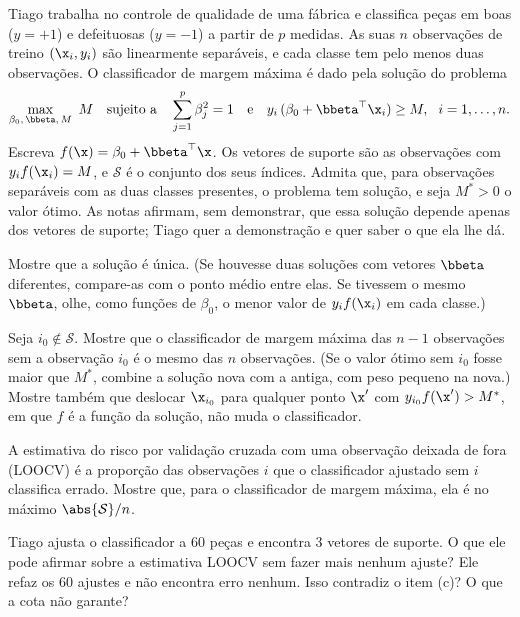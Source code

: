 Tiago trabalha no controle de qualidade de uma fábrica e classifica peças em boas ($y=+1$) e
defeituosas ($y=-1$) a partir de $p$ medidas. As suas $n$ observações de treino
$(\x_i,y_i)$ são linearmente separáveis, e cada classe tem pelo menos duas observações. O
classificador de margem máxima é dado pela solução do problema
\[
  \max_{\beta_0,\,\bbeta,\,M}\ M
  \quad\text{sujeito a}\quad
  \sum_{j=1}^p\beta_j^2=1
  \quad\text{e}\quad
  y_i\,(\beta_0+\bbeta^\top\x_i)\ge M,\ \ i=1,\dots,n .
\]
Escreva $f(\x)=\beta_0+\bbeta^\top\x$. Os vetores de suporte são as observações com
$y_if(\x_i)=M$, e $\mathcal S$ é o conjunto dos seus índices. Admita que, para observações
separáveis com as duas classes presentes, o problema tem solução, e seja $M^*>0$ o valor
ótimo. As notas afirmam, sem demonstrar, que essa solução depende apenas dos vetores de
suporte; Tiago quer a demonstração e quer saber o que ela lhe dá.
\begin{itens}
  \item {} Mostre que a solução é única. (Se houvesse duas soluções com vetores
        $\bbeta$ diferentes, compare-as com o ponto médio entre elas. Se tivessem o mesmo
        $\bbeta$, olhe, como funções de $\beta_0$, o menor valor de $y_if(\x_i)$ em cada
        classe.)
  \item {} Seja $i_0\notin\mathcal S$. Mostre que o classificador de margem máxima
        das $n-1$ observações sem a observação $i_0$ é o mesmo das $n$ observações. (Se o
        valor ótimo sem $i_0$ fosse maior que $M^*$, combine a solução nova com a antiga, com
        peso pequeno na nova.) Mostre também que deslocar $\x_{i_0}$ para qualquer ponto
        $\x'$ com $y_{i_0}f(\x')>M^*$, em que $f$ é a função da solução, não muda o
        classificador.
  \item {} A estimativa do risco por validação cruzada com uma observação deixada de
        fora (LOOCV) é a proporção das observações $i$ que o classificador ajustado sem $i$
        classifica errado. Mostre que, para o classificador de margem máxima, ela é no
        máximo $\abs{\mathcal S}/n$.
  \item {} Tiago ajusta o classificador a $60$ peças e encontra $3$ vetores de
        suporte. O que ele pode afirmar sobre a estimativa LOOCV sem fazer mais nenhum ajuste?
        Ele refaz os $60$ ajustes e não encontra erro nenhum. Isso contradiz o item (c)? O que
        a cota não garante?
\end{itens}

